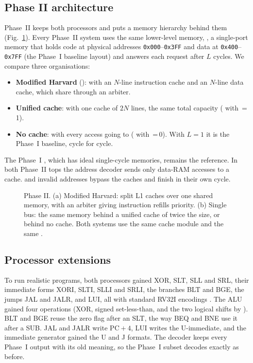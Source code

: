 \subsection{Phase II architecture}
Phase~II keeps both processors and puts a memory hierarchy behind them
(Fig.~\ref{fig:block2}). Every Phase~II system uses the same lower-level memory,
, a single-port memory that holds code at physical addresses
\texttt{0x000}--\texttt{0x3FF} and data at \texttt{0x400}--\texttt{0x7FF} (the Phase~I baseline
layout) and answers each request after $L$ cycles. We compare three organisations:
\begin{itemize}
  \item \textbf{Modified Harvard} ():  with an $N$-line
        instruction cache and an $N$-line data cache, which share  through an
        arbiter.
  \item \textbf{Unified cache}:  with one cache of $2N$ lines, the same
        total capacity ( with \,=\,1).
  \item \textbf{No cache}:  with every access going to 
        ( with \,=\,0). With $L=1$ it is the Phase~I baseline,
        cycle for cycle.
\end{itemize}
The Phase~I , which has ideal single-cycle memories, remains the reference.
In both Phase~II tops the address decoder sends only data-RAM accesses to a cache.
 and invalid addresses bypass the caches and finish in their own cycle.

\begin{figure}[t]
  \centering
  \resizebox{0.80\textwidth}{!}{}
  \caption{Phase II. (a) Modified Harvard: split L1 caches over one shared memory, with an
  arbiter giving instruction refills priority. (b) Single bus: the same memory behind a unified
  cache of twice the size, or behind no cache. Both systems use the same cache module and the
  same .}
  \label{fig:block2}
\end{figure}

\subsection{Processor extensions}
To run realistic programs, both processors gained XOR, SLT, SLL and SRL, their immediate forms
XORI, SLTI, SLLI and SRLI, the branches BLT and BGE, the jumps JAL and JALR, and LUI, all with
standard RV32I encodings \cite{riscv_spec}. The ALU gained four operations (XOR, signed
set-less-than, and the two logical shifts by ). BLT and BGE reuse the zero flag after
an SLT, the way BEQ and BNE use it after a SUB. JAL and JALR write $\mathrm{PC}+4$, LUI writes the
U-immediate, and the immediate generator gained the U and J formats. The decoder keeps every
Phase~I output with its old meaning, so the Phase~I subset decodes exactly as before.

